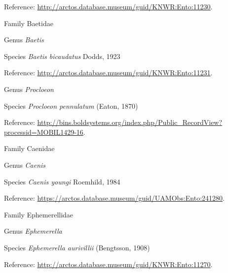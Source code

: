 \documentclass[9pt, article]{memoir}
\begin{document}
\begin{multicols}{2}
Reference: 
\url{http://arctos.database.museum/guid/KNWR:Ento:11230}.

\vspace{6pt}\noindent\hspace{24pt}Family Baetidae


\vspace{6pt}\noindent\hspace{30pt}Genus \textit{Baetis}


\vspace{6pt}\noindent\hspace{36pt}Species \textit{Baetis bicaudatus} Dodds, 1923


Reference: 
\url{http://arctos.database.museum/guid/KNWR:Ento:11231}.

\vspace{6pt}\noindent\hspace{30pt}Genus \textit{Procloeon}


\vspace{6pt}\noindent\hspace{36pt}Species \textit{Procloeon pennulatum} (Eaton, 1870)


Reference: 
\url{http://bins.boldsystems.org/index.php/Public_RecordView?processid=MOBIL1429-16}.

\vspace{6pt}\noindent\hspace{24pt}Family Caenidae


\vspace{6pt}\noindent\hspace{30pt}Genus \textit{Caenis}


\vspace{6pt}\noindent\hspace{36pt}Species \textit{Caenis youngi} Roemhild, 1984


Reference: 
\url{https://arctos.database.museum/guid/UAMObs:Ento:241280}.

\vspace{6pt}\noindent\hspace{24pt}Family Ephemerellidae


\vspace{6pt}\noindent\hspace{30pt}Genus \textit{Ephemerella}


\vspace{6pt}\noindent\hspace{36pt}Species \textit{Ephemerella aurivillii} (Bengtsson, 1908)


Reference: 
\url{http://arctos.database.museum/guid/KNWR:Ento:11270}.


\end{multicols}
\end{document}
